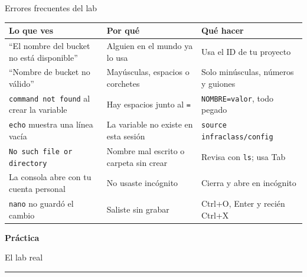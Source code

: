\documentclass[aspectratio=169,10pt,c]{beamer}
\begin{document}
\begin{frame}{Errores frecuentes del lab}
\renewcommand{\arraystretch}{1.3}
\centering\small
\begin{tabular}{@{}p{4.6cm}p{4.2cm}p{4.4cm}@{}}
\toprule
\textbf{Lo que ves} & \textbf{Por qué} & \textbf{Qué hacer}\\
\midrule
``El nombre del bucket no está disponible'' & Alguien en el mundo ya lo usa & Usa el ID de tu proyecto\\
``Nombre de bucket no válido'' & Mayúsculas, espacios o corchetes & Solo minúsculas, números y guiones\\
\texttt{command not found} al crear la variable & Hay espacios junto al \texttt{=} & \texttt{NOMBRE=valor}, todo pegado\\
\texttt{echo} muestra una línea vacía & La variable no existe en esta sesión & \texttt{source infraclass/config}\\
\texttt{No such file or directory} & Nombre mal escrito o carpeta sin crear & Revisa con \texttt{ls}; usa Tab\\
La consola abre con tu cuenta personal & No usaste incógnito & Cierra y abre en incógnito\\
\texttt{nano} no guardó el cambio & Saliste sin grabar & Ctrl+O, Enter y recién Ctrl+X\\
\bottomrule
\end{tabular}
\end{frame}

\begin{frame}[plain]
\vfill
\begin{center}
{\fontsize{29}{34}\selectfont\bfseries Práctica}\par
\vspace{2mm}
{\small El lab real}\par
\vspace{4mm}
{\color{utpRojo}\rule{8.5cm}{1.2pt}}
\end{center}
\vfill
\end{frame}
\end{document}
